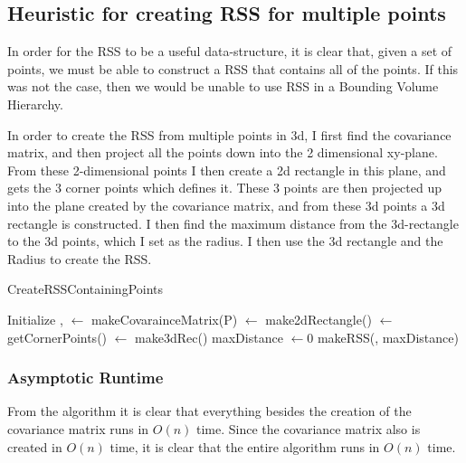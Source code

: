 \subsection{Heuristic for creating RSS for multiple points}
In order for the RSS to be a useful data-structure, it is clear that, given a set of points, we must be able to construct a RSS that contains all of the points. If this was not the case, then we would be unable to use RSS in a Bounding Volume Hierarchy.

In order to create the RSS from multiple points in 3d, I first find the covariance matrix, and then project all the points down into the 2 dimensional xy-plane. From these 2-dimensional points I then create a 2d rectangle in this plane, and gets the 3 corner points which defines it. These 3 points are then projected up into the plane created by the covariance matrix, and from these 3d points a 3d rectangle is constructed. I then find the maximum distance from the 3d-rectangle to the 3d points, which I set as the radius. I then use the 3d rectangle and the Radius to create the RSS.

\begin{algorithm}[H]
  \caption{CreateRSSContainingPoints}
   
   
  \dontprintsemicolon
  Initialize \twodeeP, \cornThree \;
  \covar $\gets$ makeCovarainceMatrix(P)\;
  \twodeeRec $\gets$ make2dRectangle(\twodeeP) \;
  \cornTwo $\gets$ getCornerPoints(\twodeeRec) \;
  \threedeeRec $\gets$ make3dRec(\cornThree) \;
  maxDistance $\gets 0$ \;
  \return makeRSS(\threedeeRec, maxDistance)
\end{algorithm}

\subsubsection{Asymptotic Runtime}
From the algorithm it is clear that everything besides the creation of the covariance matrix runs in $O(n)$ time. Since the covariance matrix also is created in $O(n)$ time, it is clear that the entire algorithm runs in $O(n)$ time.

